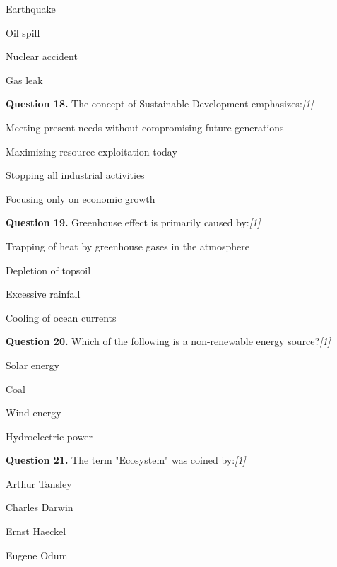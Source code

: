 \documentclass[11pt,a4paper]{article}
\newcommand{\pts}[1]{\hfill   \textit{[#1]}}
\begin{document}
\begin{parts}
  \item Earthquake
  \item Oil spill
  \item Nuclear accident
  \item Gas leak
\end{parts}

\medskip


\noindent   \textbf{Question 18.} The concept of Sustainable Development emphasizes:\pts{1}

\begin{parts}
  \item Meeting present needs without compromising future generations
  \item Maximizing resource exploitation today
  \item Stopping all industrial activities
  \item Focusing only on economic growth
\end{parts}

\medskip


\noindent   \textbf{Question 19.} Greenhouse effect is primarily caused by:\pts{1}

\begin{parts}
  \item Trapping of heat by greenhouse gases in the atmosphere
  \item Depletion of topsoil
  \item Excessive rainfall
  \item Cooling of ocean currents
\end{parts}

\medskip


\noindent   \textbf{Question 20.} Which of the following is a non-renewable energy source?\pts{1}

\begin{parts}
  \item Solar energy
  \item Coal
  \item Wind energy
  \item Hydroelectric power
\end{parts}

\medskip


\noindent   \textbf{Question 21.} The term "Ecosystem" was coined by:\pts{1}

\begin{parts}
  \item Arthur Tansley
  \item Charles Darwin
  \item Ernst Haeckel
  \item Eugene Odum
\end{parts}
\end{document}
